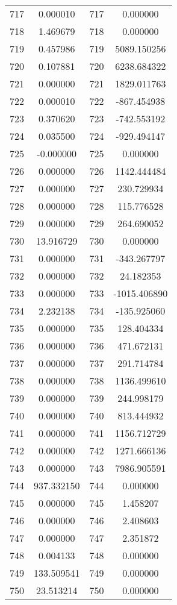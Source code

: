 \documentclass[12pt]{article}
\begin{document}
\begin{longtable}{@{}cccc@{}}
717 & 0.000010 & 717 & 0.000000 \\
718 & 1.469679 & 718 & 0.000000 \\
719 & 0.457986 & 719 & 5089.150256 \\
720 & 0.107881 & 720 & 6238.684322 \\
721 & 0.000000 & 721 & 1829.011763 \\
722 & 0.000010 & 722 & -867.454938 \\
723 & 0.370620 & 723 & -742.553192 \\
724 & 0.035500 & 724 & -929.494147 \\
725 & -0.000000 & 725 & 0.000000 \\
726 & 0.000000 & 726 & 1142.444484 \\
727 & 0.000000 & 727 & 230.729934 \\
728 & 0.000000 & 728 & 115.776528 \\
729 & 0.000000 & 729 & 264.690052 \\
730 & 13.916729 & 730 & 0.000000 \\
731 & 0.000000 & 731 & -343.267797 \\
732 & 0.000000 & 732 & 24.182353 \\
733 & 0.000000 & 733 & -1015.406890 \\
734 & 2.232138 & 734 & -135.925060 \\
735 & 0.000000 & 735 & 128.404334 \\
736 & 0.000000 & 736 & 471.672131 \\
737 & 0.000000 & 737 & 291.714784 \\
738 & 0.000000 & 738 & 1136.499610 \\
739 & 0.000000 & 739 & 244.998179 \\
740 & 0.000000 & 740 & 813.444932 \\
741 & 0.000000 & 741 & 1156.712729 \\
742 & 0.000000 & 742 & 1271.666136 \\
743 & 0.000000 & 743 & 7986.905591 \\
744 & 937.332150 & 744 & 0.000000 \\
745 & 0.000000 & 745 & 1.458207 \\
746 & 0.000000 & 746 & 2.408603 \\
747 & 0.000000 & 747 & 2.351872 \\
748 & 0.004133 & 748 & 0.000000 \\
749 & 133.509541 & 749 & 0.000000 \\
750 & 23.513214 & 750 & 0.000000 \\

\end{longtable}
\end{document}

